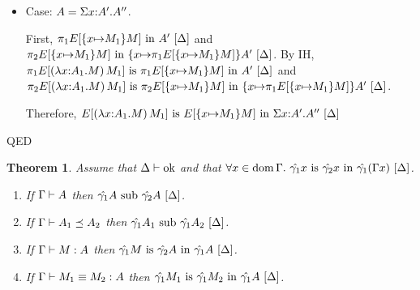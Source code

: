\documentclass{article}
\theoremstyle{break}
\newtheorem{theorem}{Theorem}
\newcommand{\qed}{\mbox{QED}}
\newcommand{\dom}{\mathop{\mathrm{dom}}}
\newcommand{\env}{\gamma}
\newenvironment{proof}{\noindent{\bf Proof:}\hspace*{0.5em}}{\hspace*{\fill}\qed}
\begin{document}
\begin{proof}
\begin{enumerate}
\begin{itemize}
\item Case: $A=\Sigma x{:}A'.A''$.

First, ${{\pi_{1}}{E[\{x{\mapsto}M_1\}{M}]}}\mathrm{\ in\ }{A'}\ [\Delta]$ and
${{\pi_{2}}{E[\{x{\mapsto}M_1\}{M}]}}\mathrm{\ in\ }{\{x{\mapsto}{\pi_{1}}{E[\{x{\mapsto}M_1\}{M}]}\}{A'}}\ [\Delta]$.
By IH,
${{\pi_{1}}{E[(\lambda x{:}A_1.M)\,M_1]}}\mathrm{\ is\ }{{\pi_{1}}{E[\{x{\mapsto}M_1\}{M}]}}\mathrm{\ in\ }{A'}\ [\Delta]$ and
${{\pi_{2}}{E[(\lambda x{:}A_1.M)\,M_1]}}\mathrm{\ is\ }{{\pi_{2}}{E[\{x{\mapsto}M_1\}{M}]}}\mathrm{\ in\ }{\{x{\mapsto}{\pi_{1}}{E[\{x{\mapsto}M_1\}{M}]}\}{A'}}\ [\Delta]$.

Therefore, 
${E[(\lambda x{:}A_1.M)\,M_1]}\mathrm{\ is\ }{E[\{x{\mapsto}M_1\}{M}]}\mathrm{\ in\ }{\Sigma x{:}A'.A''}\ [\Delta]$

\end{itemize}
\end{enumerate}
\end{proof}

\newcommand{\envone}{\hat{\env_1}}
\newcommand{\envtwo}{\hat{\env_2}}
\newcommand{\envonex}{\widehat{\env_1[\cvar{\mapsto}\cvar]}}
\newcommand{\envtwox}{\widehat{\env_2[\cvar{\mapsto}\cvar]}}

\begin{theorem}
Assume that ${\Delta}\vdash\mbox{ok}$ and that
$\forall\cvar\in\dom\context.\ \semanticequivterm{\world}{\envone\cvar}{\envtwo\cvar}{\envone(\context\cvar)}$.
\begin{enumerate}
\item If $\Gamma\vdash A$ then $\semanticsubtype{\world}{\envone\kind}{\envtwo\kind}$.
\item If $\mbox{$\Gamma\vdash A_1 \preceq A_2$}$ then
$\semanticsubtype{\world}{\envone\kind_1}{\envone\kind_2}$.
\item If $\Gamma\vdash M : A$ then
$\semanticequivterm{\world}{\envone\constructor}{\envtwo{\kind}}{\envone\kind}$.
\item If $\Gamma\vdash M_1 \equiv M_2 : A$
then $\semanticequivterm{\world}{\envone\constructor_1}{\envone\constructor_2}{\envone\kind}$.
\end{enumerate}
\end{theorem}
\end{document}
